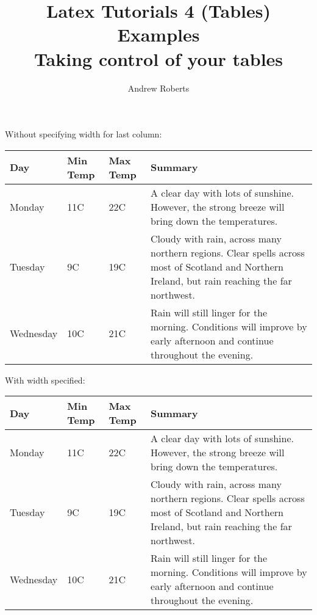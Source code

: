 \documentclass[english]{article}
\begin{document}
\title{Latex Tutorials 4 (Tables) Examples \\Taking control of your tables}
\author{Andrew Roberts}
\maketitle

Without specifying width for last column:

\begin{center}
	\begin{tabular}{ | l | l | l | l |}
	\hline
	Day & Min Temp & Max Temp & Summary \\ \hline
	Monday & 11C & 22C & A clear day with lots of sunshine.  However, the strong breeze will bring down the temperatures. \\ \hline
	Tuesday & 9C & 19C & Cloudy with rain, across many northern regions. Clear spells across most of Scotland and Northern Ireland, but rain reaching the far northwest. \\ \hline
	Wednesday & 10C & 21C & Rain will still linger for the morning. Conditions will improve by early afternoon and continue throughout the evening. \\
	\hline
	\end{tabular}
\end{center}

With width specified:

\begin{center}
	\begin{tabular}{ | l | l | l | p{5cm} |}
	\hline
	Day & Min Temp & Max Temp & Summary \\ \hline
	Monday & 11C & 22C & A clear day with lots of sunshine.  However, the strong breeze will bring down the temperatures. \\ \hline
	Tuesday & 9C & 19C & Cloudy with rain, across many northern regions. Clear spells across most of Scotland and Northern Ireland, but rain reaching the far northwest. \\ \hline
	Wednesday & 10C & 21C & Rain will still linger for the morning. Conditions will improve by early afternoon and continue throughout the evening. \\
	\hline
	\end{tabular}
\end{center}
\end{document}
